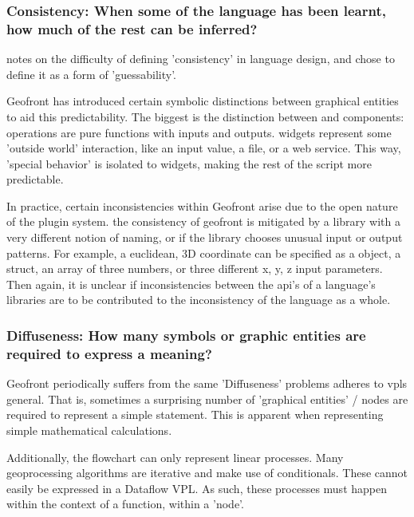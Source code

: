 \subsubsection*{Consistency: When some of the language has been learnt, how much of the rest can be inferred?}

\cite[]{green_usability_1996} notes on the difficulty of defining 'consistency' in language design, and chose to define it as a form of 'guessability'.

Geofront has introduced certain symbolic distinctions between graphical entities to aid this predictability. 
The biggest is the distinction between  and  components: 
operations are pure functions with inputs and outputs. 
widgets represent some 'outside world' interaction, like an input value, a file, or a web service. 
This way, 'special behavior' is isolated to widgets, making the rest of the script more predictable. 

In practice, certain inconsistencies within Geofront arise due to the open nature of the plugin system. 
the consistency of geofront is mitigated by a library with a very different notion of naming, or if the library chooses unusual input or output patterns. 
For example, a euclidean, 3D coordinate can be specified as a  object, a struct, an array of three numbers, or three different x, y, z input parameters.
Then again, it is unclear if inconsistencies between the api's of a language's libraries are to be contributed to the inconsistency of the language as a whole. 


\subsubsection*{Diffuseness: How many symbols or graphic entities are required to express a meaning?}

Geofront periodically suffers from the same 'Diffuseness' problems \cite[]{green_usability_1996} adheres to vpls general. 
That is, sometimes a surprising number of 'graphical entities' / nodes are required to represent a simple statement.  
This is apparent when representing simple mathematical calculations. 

Additionally, the flowchart can only represent linear processes. Many geoprocessing algorithms are iterative and make use of conditionals. These cannot easily be expressed in a Dataflow VPL. As such, these processes must happen within the context of a function, within a 'node'.

